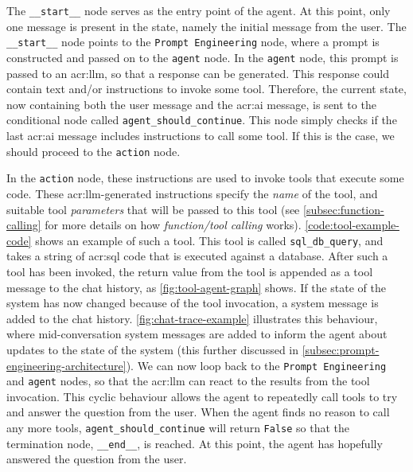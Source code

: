 The \texttt{\_\_start\_\_} node serves as the entry point of the agent. At this point, only one message is present in the state, namely the initial message from the user. The \texttt{\_\_start\_\_} node points to the \texttt{Prompt Engineering} node, where a prompt is constructed and passed on to the \texttt{agent} node. In the \texttt{agent} node, this prompt is passed to an \acrshort{acr:llm}, so that a response can be generated. This response could contain text and/or instructions to invoke some tool. Therefore, the current state, now containing both the user message and the \acrshort{acr:ai} message, is sent to the conditional node called \texttt{agent\_should\_continue}. This node simply checks if the last \acrshort{acr:ai} message includes instructions to call some tool. If this is the case, we should proceed to the \texttt{action} node.

In the \texttt{action} node, these instructions are used to invoke tools that execute some code. These \acrshort{acr:llm}-generated instructions specify the \textit{name} of the tool, and suitable tool \textit{parameters} that will be passed to this tool (see \autoref{subsec:function-calling} for more details on how \textit{function/tool calling} works). \autoref{code:tool-example-code} shows an example of such a tool. This tool is called \texttt{sql\_db\_query}, and takes a string of \acrshort{acr:sql} code that is executed against a database. After such a tool has been invoked, the return value from the tool is appended as a tool message to the chat history, as \autoref{fig:tool-agent-graph} shows. If the state of the system has now changed because of the tool invocation, a system message is added to the chat history. \autoref{fig:chat-trace-example} illustrates this behaviour, where mid-conversation system messages are added to inform the agent about updates to the state of the system (this further discussed in \autoref{subsec:prompt-engineering-architecture}). We can now loop back to the \texttt{Prompt Engineering} and \texttt{agent} nodes, so that the \acrshort{acr:llm} can react to the results from the tool invocation. This cyclic behaviour allows the agent to repeatedly call tools to try and answer the question from the user. When the agent finds no reason to call any more tools, \texttt{agent\_should\_continue} will return \texttt{False} so that the termination node, \texttt{\_\_end\_\_}, is reached. At this point, the agent has hopefully answered the question from the user.

